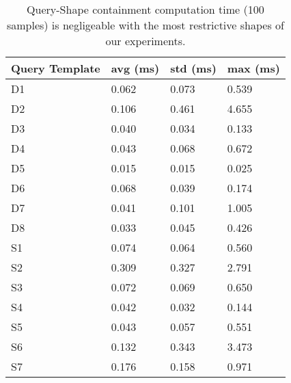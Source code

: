 \begin{table}
	\begin{center}
		\begin{tabular}{|l|l|l|l|}
			\hline
			Query Template & avg (ms) & std (ms) & max (ms) \\
			\hline
			D1 & 0.062 & 0.073 & 0.539 \\
			\hline
			D2 & 0.106 & 0.461 & 4.655 \\
			\hline
			D3 & 0.040 & 0.034 & 0.133 \\
			\hline
			D4 & 0.043 & 0.068 & 0.672 \\
			\hline
			D5 & 0.015 & 0.015 & 0.025 \\
			\hline
			D6 & 0.068 & 0.039 & 0.174 \\
			\hline
			D7 & 0.041 & 0.101 & 1.005 \\
			\hline
			D8 & 0.033 & 0.045 & 0.426 \\
			\hline
			S1 & 0.074 & 0.064 & 0.560 \\
			\hline
			S2 & 0.309 & 0.327 & 2.791 \\
			\hline
			S3 & 0.072 & 0.069 & 0.650 \\
			\hline
			S4 & 0.042 & 0.032 & 0.144 \\
			\hline
			S5 & 0.043 & 0.057 & 0.551 \\
			\hline
			S6 & 0.132 & 0.343 & 3.473 \\
			\hline
			S7 & 0.176 & 0.158 & 0.971 \\
			\hline
		\end{tabular}
	\end{center}
	\caption{Query-Shape containment computation time (100 samples) is negligeable with the most restrictive shapes of our experiments.}
	\label{tab:queryShapeContainmentEval}
\end{table}